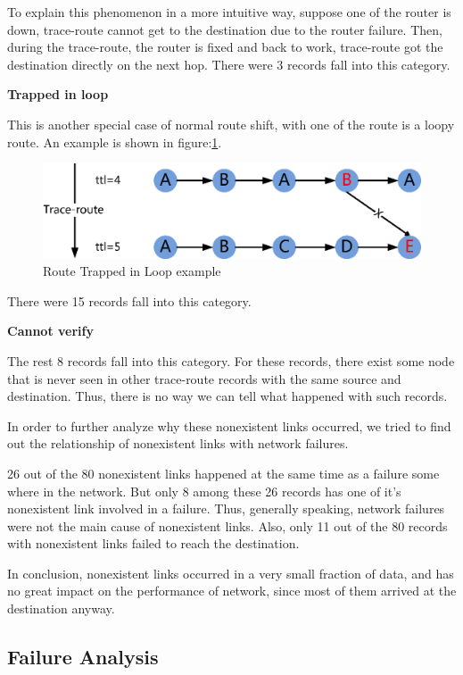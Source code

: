 \documentclass[conference, twocolumn, oneside, 10pt]{IEEEtran}
\begin{document}
To explain this phenomenon in a more intuitive way, suppose one of the router is down, trace-route cannot get to the destination due to the router failure. Then, during the trace-route, the router is fixed and back to work, trace-route got the destination directly on the next hop. There were 3 records fall into this category.

\textbf{Trapped in loop}

This is another special case of normal route shift, with one of the route is a loopy route. An example is shown in figure:\ref{fig:TrappedInLoop}.

\begin{figure}[h!]
  \centering
  \includegraphics[scale=0.5]{plot/TrappedInLoop.eps}
  \caption{Route Trapped in Loop example}
  \label{fig:TrappedInLoop}
\end{figure}

There were 15 records fall into this category.

\textbf{Cannot verify}

The rest 8 records fall into this category. For these records, there exist some node that is never seen in other trace-route records with the same source and destination. Thus, there is no way we can tell what happened with such records.

In order to further analyze why these nonexistent links occurred, we tried to find out the relationship of nonexistent links with network failures.

26 out of the 80 nonexistent links happened at the same time as a failure some where in the network. But only 8 among these 26 records has one of it's nonexistent link involved in a failure. Thus, generally speaking, network failures were not the main cause of nonexistent links. Also, only 11 out of the 80 records with nonexistent links failed to reach the destination.

In conclusion, nonexistent links occurred in a very small fraction of data, and has no great impact on the performance of network, since most of them arrived at the destination anyway.

\subsection{Failure Analysis}
\end{document}
